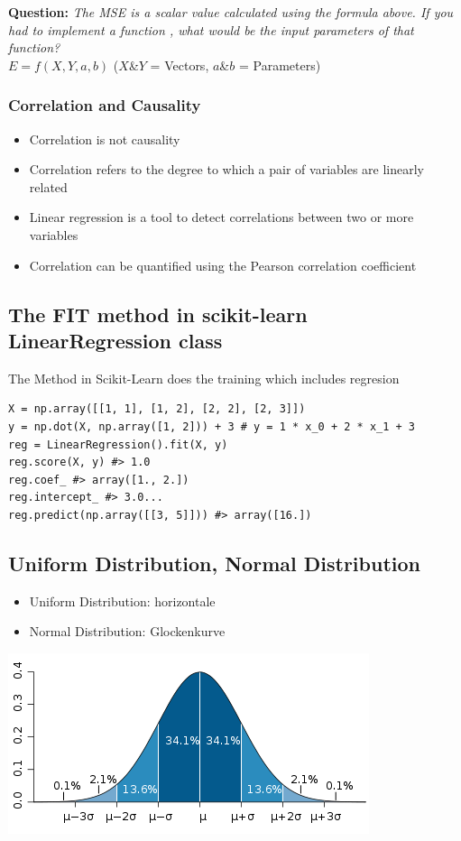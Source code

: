 \textbf{Question:} \textit{The MSE is a scalar value calculated using the formula above. If you had to implement a function , what would be the input parameters of that function?}\\
$E = f(X, Y, a, b)$ ($X$\&$Y$ = Vectors, $a$\&$b$ = Parameters)

\subsubsection{Correlation and Causality}
\begin{itemize}
    \item Correlation is not causality
    \item Correlation refers to the degree to which a pair of variables are linearly related
    \item Linear regression is a tool to detect correlations between two or more variables
    \item Correlation can be quantified using the Pearson correlation coefficient
\end{itemize}


\subsection{The FIT method in scikit-learn LinearRegression class}
The  Method in Scikit-Learn does the training which includes regresion

\begin{verbatim}
X = np.array([[1, 1], [1, 2], [2, 2], [2, 3]])
y = np.dot(X, np.array([1, 2])) + 3 # y = 1 * x_0 + 2 * x_1 + 3
reg = LinearRegression().fit(X, y)
reg.score(X, y) #> 1.0
reg.coef_ #> array([1., 2.])
reg.intercept_ #> 3.0...
reg.predict(np.array([[3, 5]])) #> array([16.])
\end{verbatim}

\subsection{Uniform Distribution, Normal Distribution}
\begin{itemize}
    \item Uniform Distribution: horizontale 
    \item Normal Distribution: Glockenkurve
\end{itemize}

\includegraphics[width=0.8\linewidth]{./img/normal_distribution.png}


